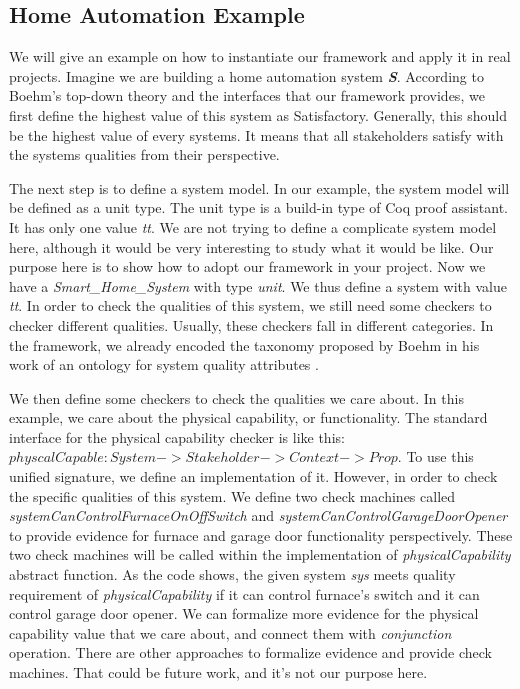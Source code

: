 \documentclass[conference]{IEEEtran}
\begin{document}
\subsection{Home Automation Example}
We will give an example on how to instantiate our framework and apply it in real projects. Imagine we are building a home automation system \textbf{{\em S}}. According to Boehm's top-down theory and the interfaces that our framework provides, we first define the highest value of this system as Satisfactory. Generally, this should be the highest value of every systems. It means that all stakeholders satisfy with the systems qualities from their perspective. 

The next step is to define a system model. In our example, the system model will be defined as a unit type. The unit type is a build-in type of Coq proof assistant. It has only one value {\em tt}. We are not trying to define a complicate system model here, although it would be very interesting to study what it would be like. Our purpose here is to show how to adopt our framework in your project. Now we have a {\em Smart\_Home\_System} with type {\em unit}. We thus define a system with value {\em tt}. In order to check the qualities of this system, we still need some checkers to checker different qualities. Usually, these checkers fall in different categories. In the framework, we already encoded the taxonomy proposed by Boehm in his work of an ontology for system quality attributes \cite{Boehm:ontology}.

We then define some checkers to check the qualities we care about. In this example, we care about the physical capability, or functionality. The standard interface for the physical capability checker is like this: $physcalCapable: System->Stakeholder->Context->Prop$. To use this unified signature, we define an implementation of it. However, in order to check the specific qualities of this system. We define two check machines called {\em systemCanControlFurnaceOnOffSwitch} and {\em systemCanControlGarageDoorOpener} to provide evidence for furnace and garage door functionality perspectively. These two check machines will be called within the implementation of {\em physicalCapability} abstract function. As the code shows, the given system {\em sys} meets quality requirement of {\em physicalCapability} if it can control furnace's switch and it can control garage door opener. We can formalize more evidence for the physical capability value that we care about, and connect them with {\em conjunction} operation. There are other approaches to formalize evidence and provide check machines. That could be future work, and it's not our purpose here.
\end{document}
